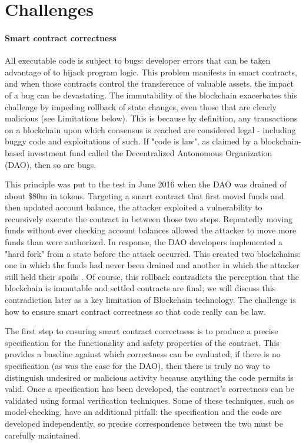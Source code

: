 
\section{Challenges}
\label{sec:challenges}

\paragraph{Smart contract correctness}
All executable code is subject to bugs: developer errors that can be taken advantage of to hijack program logic. This problem manifests in smart contracts, and when those contracts control the transference of valuable assets, the impact of a bug can be devastating. The immutability of the blockchain exacerbates this challenge by impeding rollback of state changes, even those that are clearly malicious (see Limitations below). This is because by definition, any transactions on a blockchain upon which consensus is reached are considered legal - including buggy code and exploitations of such. If "code is law", as claimed by a blockchain-based investment fund called the Decentralized Autonomous Organization (DAO), then so are bugs. 

This principle was put to the test in June 2016 when the DAO was drained of about \$80m in tokens. Targeting a smart contract that first moved funds and then updated account balance, the attacker exploited a vulnerability to recursively execute the contract in between those two steps. Repeatedly moving funds without ever checking account balances allowed the attacker to move more funds than were authorized. In response, the DAO developers implemented a "hard fork" from a state before the attack occurred. This created two blockchains: one in which the funds had never been drained and another in which the attacker still held their spoils \cite{Castillo16}. Of course, this rollback contradicts the perception that the blockchain is immutable and settled contracts are final; we will discuss this contradiction later as a key limitation of Blockchain technology. The challenge is how to ensure smart contract correctness so that code really can be law.

The first step to ensuring smart contract correctness is to produce a precise specification for the functionality and safety properties of the contract. This provides a baseline against which correctness can be evaluated; if there is no specification (as was the case for the DAO), then there is truly no way to distinguish undesired or malicious activity because anything the code permits is valid. Once a specification has been developed, the contract's correctness can be validated using formal verification techniques. Some of these techniques, such as model-checking, have an additional pitfall: the specification and the code are developed independently, so precise correspondence between the two must be carefully maintained.

